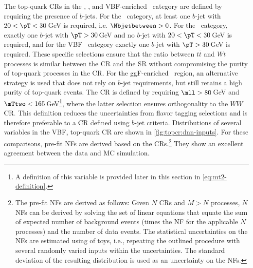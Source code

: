 The top-quark CRs in the \ZeroJet, \OneJet, and VBF-enriched \TwoJet\ category are defined by requiring the presence of $b$-jets.
For the \ZeroJet\ category, at least one $b$-jet with $20 < \pT < 30\,$GeV is required, i.e.  $\Nbjetbetween > 0$.
For the \OneJet\ category, exactly one $b$-jet with $\pT > 30\,$GeV and no $b$-jet with $20 < \pT < 30\,$GeV is required, and for the VBF \TwoJet\ category exactly one $b$-jet with $\pT > 30\,$GeV is required.
These specific selections ensure that the ratio between $t\bar{t}$ and $Wt$ processes is similar between the CR and the SR without compromising the purity of top-quark processes in the CR.
For the ggF-enriched \TwoJet\ region, an alternative strategy is used that does not rely on $b$-jet requirements, but still retains a high purity of top-quark events. The CR is defined by requiring $\mll > 80\,$GeV and $\mTtwo < 165\,$GeV\footnote{A definition of this variable is provided later in this section in \cref{eq:mt2-definition}.}, where the latter selection ensures orthogonality to the $WW$ CR. This definition reduces the uncertainties from flavor tagging selections and is therefore preferable to a CR defined using $b$-jet criteria.
Distributions of several variables in the VBF, top-quark CR are shown in \cref{fig:topcr:dnn-inputs}.
For these comparisons, pre-fit NFs are derived based on the CRs.\footnote{The pre-fit NFs are derived as follows: Given $N$ CRs and $M > N$ processes, $N$ NFs can be derived by solving the set of linear equations that equate the sum of expected number of background events (times the NF for the applicable $N$ processes) and the number of data events. The statistical uncertainties on the NFs are estimated using of toys, i.e., repeating the outlined procedure with several randomly varied inputs within the uncertainties. The standard deviation of the resulting distribution is used as an uncertainty on the NFs.}
They show an excellent agreement between the data and MC simulation.

